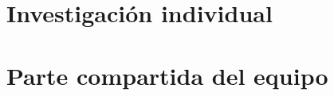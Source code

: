 \documentclass[11pt,letterpaper,DIV=12,parskip=half]{scrartcl}
\begin{document}


\part{Investigación individual}


\part{Parte compartida del equipo}


\printbibliography
\end{document}
